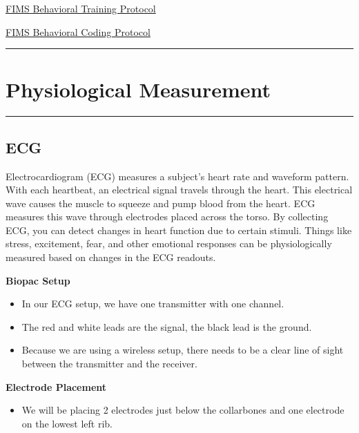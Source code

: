 \documentclass[]{book}
\providecommand{\tightlist}{%
  \setlength{\itemsep}{0pt}\setlength{\parskip}{0pt}}
\begin{document}
\href{https://docs.google.com/document/d/1oLEg1gAdpcrDWg1Vlh0z_esq9fBy9CKBrNuU-ZokaKg/edit?usp=sharing}{FIMS Behavioral Training Protocol}

\href{https://docs.google.com/document/d/1zd4BD7-yQZxle4bH_cXrEaqFAd3MCVKATnVE1PnWn_4/edit?usp=sharing}{FIMS Behavioral Coding Protocol}

\begin{center}\rule{0.5\linewidth}{0.5pt}\end{center}

\hypertarget{physiological-measurement}{%
\section{Physiological Measurement}\label{physiological-measurement}}

\begin{center}\rule{0.5\linewidth}{0.5pt}\end{center}

\hypertarget{ecg}{%
\subsection{ECG}\label{ecg}}

Electrocardiogram (ECG) measures a subject's heart rate and waveform pattern. With each heartbeat, an electrical signal travels through the heart. This electrical wave causes the muscle to squeeze and pump blood from the heart. ECG measures this wave through electrodes placed across the torso. By collecting ECG, you can detect changes in heart function due to certain stimuli. Things like stress, excitement, fear, and other emotional responses can be physiologically measured based on changes in the ECG readouts.

\textbf{Biopac Setup}

\begin{itemize}
\tightlist
\item
  In our ECG setup, we have one transmitter with one channel.
\item
  The red and white leads are the signal, the black lead is the ground.
\item
  Because we are using a wireless setup, there needs to be a clear line of sight between the transmitter and the receiver.
\end{itemize}

\textbf{Electrode Placement}

\begin{itemize}
\tightlist
\item
  We will be placing 2 electrodes just below the collarbones and one electrode on the lowest left rib.
\end{itemize}
\end{document}
